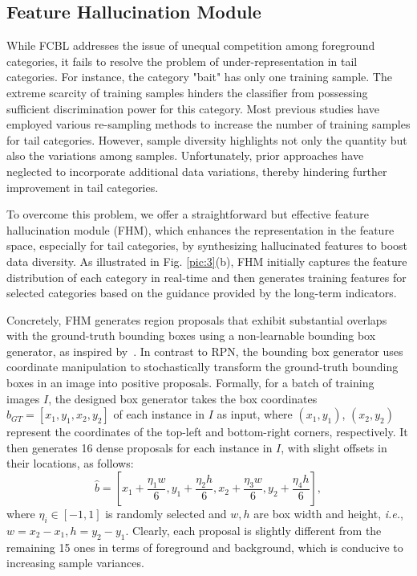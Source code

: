 \documentclass[lettersize,journal]{IEEEtran}
\begin{document}
\subsection{Feature Hallucination Module}\label{sec:3.5}

While FCBL addresses the issue of unequal competition among foreground categories, it fails to resolve the problem of under-representation in tail categories.
For instance, the category "bait" has only one training sample.
The extreme scarcity of training samples hinders the classifier from possessing sufficient discrimination power for this category.
Most previous studies have employed various re-sampling methods to increase the number of training samples for tail categories.
However, sample diversity highlights not only the quantity but also the variations among samples.
Unfortunately, prior approaches have neglected to incorporate additional data variations, thereby hindering further improvement in tail categories.


To overcome this problem, we offer a straightforward but effective feature hallucination module (FHM), which enhances the representation in the feature space, especially for tail categories, by synthesizing hallucinated features to boost data diversity.
As illustrated in Fig. \ref{pic:3}(b), FHM initially captures the feature distribution of each category in real-time and then generates training features for selected categories based on the guidance provided by the long-term indicators.



Concretely, FHM generates region proposals that exhibit substantial overlaps with the ground-truth bounding boxes using a non-learnable bounding box generator, as inspired by~\cite{feng2021exploring}.
In contrast to RPN, the bounding box generator uses coordinate manipulation to stochastically transform the ground-truth bounding boxes in an image into positive proposals.
Formally, for a batch of training images $I$, the designed box generator takes the box coordinates $b_{GT}=[x_1,y_1,x_2,y_2]$ of each instance in $I$ as input, where $(x_1,y_1)$, $(x_2,y_2)$ represent the coordinates of the top-left and bottom-right corners, respectively.
It then generates 16 dense proposals for each instance in $I$, with slight offsets in their locations, as follows:
\begin{equation}
    \hat{b}=[x_1+\frac{\eta_1 w}{6},y_1+\frac{\eta_2 h}{6}, x_2+\frac{\eta_3 w}{6},y_2+\frac{\eta_4 h}{6}],
\end{equation}
where $\eta_{i}\in[-1,1]$ is randomly selected and $w,h$ are box width and height, {\em i.e.}, $w=x_2-x_1,h=y_2-y_1$.
Clearly, each proposal is slightly different from the remaining 15 ones in terms of foreground and background, which is conducive to increasing sample variances.
\end{document}
